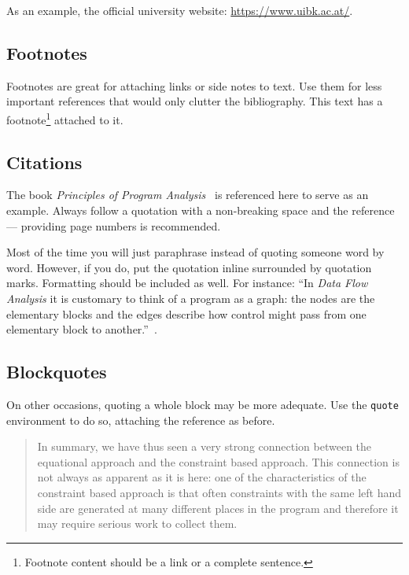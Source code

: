 \documentclass[parskip=half]{scrbook}
\begin{document}
As an example, the official university website: \url{https://www.uibk.ac.at/}.

\subsection{Footnotes}

Footnotes are great for attaching links or side notes to text.
Use them for less important references that would only clutter the bibliography.
This text has a footnote\footnote{Footnote content should be a link or a complete sentence.} attached to it.

\subsection{Citations}

The book \emph{Principles of Program Analysis}~\cite{Nielson:ppa} is referenced here to serve as an example.
Always follow a quotation with a non-breaking space and the reference --- providing page numbers is recommended.

Most of the time you will just paraphrase instead of quoting someone word by word.
However, if you do, put the quotation inline surrounded by quotation marks.
Formatting should be included as well.
For instance: ``In \emph{Data Flow Analysis} it is customary to think of a program as a graph: the nodes are the elementary blocks and the edges describe how control might pass from one elementary block to another.''~\cite[p.~5]{Nielson:ppa}.

\subsection{Blockquotes}

On other occasions, quoting a whole block may be more adequate.
Use the \texttt{quote} environment to do so, attaching the reference as before.

\begin{quote}
	In summary, we have thus seen a very strong connection between the equational approach and the constraint based approach.
	This connection is not always as apparent as it is here: one of the characteristics of the constraint based approach is that often constraints with the same left hand side are generated at many different places in the program and therefore it may require serious work to collect them.~\cite[p.~10]{Nielson:ppa}
\end{quote}
\end{document}
